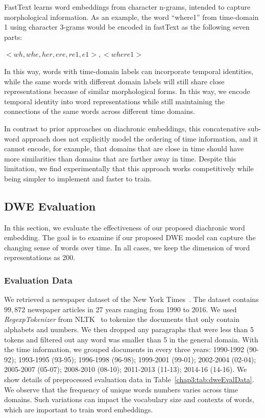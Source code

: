 FastText learns word embeddings from character n-grams, intended to capture morphological information. As an example, the word ``where1'' from time-domain 1 using character 3-grams would be encoded in fastText as the following seven parts:
\begin{center}
    $<wh, whe, her, ere, re1, e1>, <where1>$
\end{center}

In this way, words with time-domain labels can incorporate temporal identities, while the same words with different domain labels will still share close representations because of similar morphological forms. In this way, we encode temporal identity into word representations while still maintaining the connections of the same words across different time domains. 

In contrast to prior approaches on diachronic embeddings, this concatenative sub-word approach does not explicitly model the ordering of time information, and it cannot encode, for example, that domains that are close in time should have more similarities than domains that are farther away in time.
Despite this limitation, we find experimentally that this approach works competitively while being simpler to implement and faster to train.

\subsection{DWE Evaluation}
\label{chap3:subsec:dweEval}

In this section, we evaluate the effectiveness of our proposed diachronic word embedding.
The goal is to examine if our proposed DWE model can capture the changing sense of words over time.
In all cases, we keep the dimension of word representations as 200.

\subsubsection{Evaluation Data}
We retrieved a newspaper dataset of the New York Times~\cite{yao2018dynamic}.
The dataset contains $99,872$ newspaper articles in 27 years ranging from 1990 to 2016.
We used \textit{RegexpTokenizer} from NLTK~\cite{bird2004nltk} to tokenize the documents that only contain alphabets and numbers.
We then dropped any paragraphs that were less than 5 tokens and filtered out any word was smaller than 5 in the general domain.
With the time information, we grouped documents in every three years: 1990-1992 (90-92); 1993-1995 (93-95); 1996-1998 (96-98); 1999-2001 (99-01); 2002-2004 (02-04); 2005-2007 (05-07); 2008-2010 (08-10); 2011-2013 (11-13); 2014-16 (14-16). 
We show details of preprocessed evaluation data in Table~\ref{chap3:tab:dweEvalData}.
We observe that the frequency of unique words numbers varies across time domains. 
Such variations can impact the vocabulary size and contexts of words, which are important to train word embeddings.

